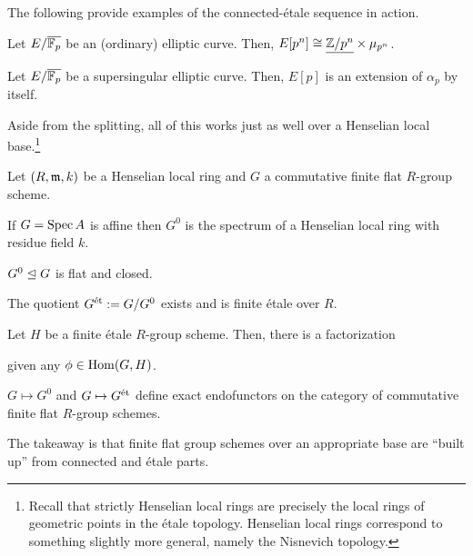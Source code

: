 \documentclass[11pt]{article}
\begin{document}
\begin{example}
The following provide examples of the connected-\'{e}tale sequence in action.
\begin{enum}{\arabic}
\item Let $E/\overline{\mathbb{F}_p}$ be an (ordinary) elliptic curve. Then, $E[p^n]\cong\underline{\mathbb{Z}/p^n}\times\mu_{p^n}$.
\item Let $E/\overline{\mathbb{F}_p}$ be a supersingular elliptic curve. Then, $E[p]$  is an extension of $\alpha_p$ by itself.
\end{enum}
\end{example}

Aside from the splitting, all of this works just as well over a Henselian local base.\footnote{Recall that strictly Henselian local rings are precisely the local rings of geometric points in the \'{e}tale topology. Henselian local rings correspond to something slightly more general, namely the Nisnevich topology.}

\begin{theorem}
Let $(R,\mathfrak{m},k)$ be a Henselian local ring and $G$ a commutative finite flat $R$-group scheme.
\begin{enum}{\alph}
\item If $G=\operatorname{Spec} A$ is affine then $G^0$ is the spectrum of a Henselian local ring with residue field $k$.

\item $G^0\trianglelefteq G$ is flat and closed.

\item The quotient $G^{\operatorname{\acute{e}t}}:=G/G^0$ exists and is finite \'{e}tale over $R$.

\item Let $H$ be a finite \'{e}tale $R$-group scheme. Then, there is a factorization
\begin{center}
\end{center}
given any $\phi\in\operatorname{Hom}(G,H)$.

\item $G\mapsto G^0$ and $G\mapsto G^{\operatorname{\acute{e}t}}$ define exact endofunctors on the category of commutative finite flat $R$-group schemes.
\end{enum}
\end{theorem}

The takeaway is that finite flat group schemes over an appropriate base are ``built up'' from connected and \'{e}tale parts.
\end{document}
